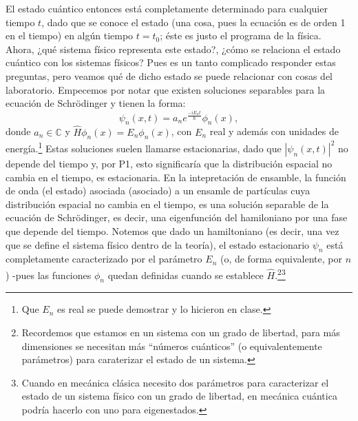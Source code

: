 \documentclass[10pt,letterpaper]{article}
\begin{document}
El estado cuántico entonces está completamente determinado para cualquier tiempo $t$, dado que se conoce el estado (una cosa, pues la ecuación es de orden 1 en el tiempo) en algún tiempo $t=t_0$; éste es justo el programa de la física. Ahora, ¿qué sistema físico representa este estado?, ¿cómo se relaciona el estado cuántico con los sistemas físicos? Pues es un tanto complicado responder estas preguntas, pero veamos qué de dicho estado se puede relacionar con cosas del laboratorio. Empecemos por notar que existen soluciones separables para la ecuación de Schrödinger y tienen la forma:
\begin{equation}
\psi_n(x,t) = a_n e^{\frac{-iE_n t}{\hbar}}\phi_n(x),
\end{equation}
donde $a_n\in \mathbb{C}$ y $\hat{H}\phi_n(x) = E_n\phi_n(x)$, con $E_n$ real y además con unidades de energía.\footnote{Que $E_n$ es real se puede demostrar y lo hicieron en clase.} Estas soluciones suelen llamarse estacionarias, dado que $|\psi_n(x,t)|^2$ no depende del tiempo y, por P1, esto significaría que la distribución espacial no cambia en el tiempo, es estacionaria. En la intepretación de ensamble, la función de onda (el estado) asociada (asociado) a un ensamle de partículas cuya distribución espacial no cambia en el tiempo, es una solución separable de la ecuación de Schrödinger, es decir, una eigenfunción del hamiloniano por una fase que depende del tiempo.
Notemos que dado un hamiltoniano (es decir, una vez que se define el sistema físico dentro de la teoría), el estado estacionario $\psi_n$ está completamente caracterizado por el parámetro $E_n$ (o, de forma equivalente, por $n$) -pues las funciones $\phi_n$ quedan definidas cuando se establece $\hat{H}$.\footnote{Recordemos que estamos en un sistema con un grado de libertad, para más dimensiones se necesitan más ``números cuánticos'' (o equivalentemente parámetros) para caraterizar el estado de un sistema.}\footnote{Cuando en mecánica clásica necesito dos parámetros para caracterizar el estado de un sistema físico con un grado de libertad, en mecánica cuántica podría hacerlo con uno para eigenestados.}
\end{document}
